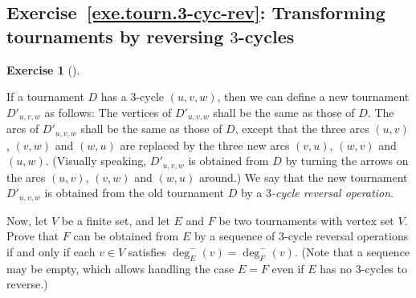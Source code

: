 \documentclass[numbers=enddot,12pt,final,onecolumn,notitlepage]{scrartcl}%
\newcounter{exer}
\theoremstyle{definition}
\newtheorem{exmp}[exer]{Exercise}
\newenvironment{exercise}[1][]
{\begin{exmp}[#1]\begin{leftbar}}
{\end{leftbar}\end{exmp}}
\newcommand{\tup}[1]{\left( #1 \right)}
\begin{document}
\subsection{Exercise~\ref{exe.tourn.3-cyc-rev}: Transforming
tournaments by reversing $3$-cycles}

\begin{exercise} \label{exe.tourn.3-cyc-rev}
If a tournament $D$ has a $3$-cycle $\tup{u, v, w}$, then
we can define a new tournament $D'_{u, v, w}$ as follows: The vertices
of $D'_{u, v, w}$ shall be the same as those of $D$. The arcs of
$D'_{u, v, w}$ shall be the same as those of $D$, except that the
three arcs $\tup{u, v}$, $\tup{v, w}$ and $\tup{w, u}$ are replaced
by the three new arcs $\tup{v, u}$, $\tup{w, v}$ and $\tup{u, w}$.
(Visually speaking, $D'_{u, v, w}$ is obtained from $D$ by turning the
arrows on the arcs $\tup{u, v}$, $\tup{v, w}$ and $\tup{w, u}$
around.) We say that the new tournament $D'_{u, v, w}$ is obtained
from the old tournament $D$ by a
\textit{$3$-cycle reversal operation}.

Now, let $V$ be a finite set, and let $E$ and $F$ be two tournaments
with vertex set $V$. Prove that $F$ can be obtained from $E$ by a
sequence of $3$-cycle reversal operations if and only if each
$v \in V$ satisfies $\deg^-_E \tup{v} = \deg^-_F \tup{v}$.
(Note that a sequence may be empty, which allows handling the case
$E = F$ even if $E$ has no $3$-cycles to reverse.)
\end{exercise}
\end{document}
